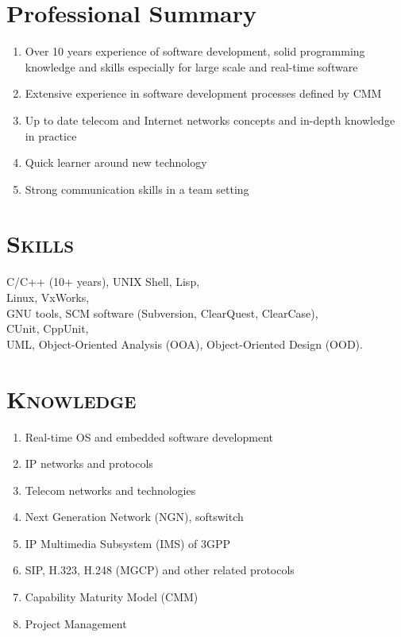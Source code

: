 \documentclass[margin,11pt]{res}
\begin{document}
\begin{resume}
 
\section{Professional Summary}

\begin{enumerate}
    \item Over 10 years experience of software development, solid programming knowledge and
      skills especially for large scale and real-time software
    \item Extensive experience in software development processes defined by CMM
    \item Up to date telecom and Internet networks concepts and in-depth knowledge in practice
    \item Quick learner around new technology
    \item Strong communication skills in a team setting
\end{enumerate}

\section{\textsc{Skills}} 
   C/C++ (10+ years), UNIX Shell, Lisp, \\
   Linux, VxWorks, \\
   GNU tools, SCM software (Subversion, ClearQuest, ClearCase),\\
   CUnit, CppUnit, \\
   UML, Object-Oriented Analysis (OOA), Object-Oriented Design (OOD).

\section{\textsc{Knowledge}} 
\begin{enumerate}
    \item Real-time OS and embedded software development
    \item IP networks and protocols
    \item Telecom networks and technologies
    \item Next Generation Network (NGN), softswitch
    \item IP Multimedia Subsystem (IMS) of 3GPP
    \item SIP, H.323, H.248 (MGCP) and other related protocols
    \item Capability Maturity Model (CMM)
    \item Project Management
\end{enumerate}
 

\end{resume}
\end{document}

